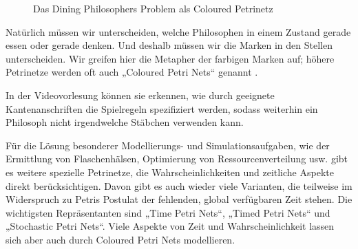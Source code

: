 \begin{figure}[!htbp]
	\centering
	\caption{Das Dining Philosophers Problem als Coloured Petrinetz}
	\label{fig:v9_fuenf_philosophen_colored}
\end{figure}


Natürlich müssen wir unterscheiden, welche Philosophen in einem Zustand gerade essen oder gerade denken. Und deshalb müssen wir die Marken in den Stellen unterscheiden. Wir greifen hier die Metapher der farbigen Marken auf; 
höhere Petrinetze werden oft auch „Coloured Petri Nets“ genannt \cite{jen09}.

In der Videovorlesung können sie erkennen, wie durch geeignete Kantenanschriften die Spielregeln spezifiziert werden, sodass weiterhin ein Philosoph nicht irgendwelche Stäbchen verwenden kann.

Für die Lösung besonderer Modellierungs- und Simulationsaufgaben, wie der Ermittlung von Flaschenhälsen, Optimierung von Ressourcenverteilung usw. gibt es weitere spezielle Petrinetze, die Wahrscheinlichkeiten und zeitliche Aspekte direkt berücksichtigen. Davon gibt es auch wieder viele Varianten, die teilweise im Widerspruch zu Petris Postulat der fehlenden, global verfügbaren Zeit stehen. Die wichtigsten Repräsentanten sind „Time Petri Nets“, „Timed Petri Nets“ und „Stochastic Petri Nets“. Viele Aspekte von Zeit und Wahrscheinlichkeit lassen sich aber auch durch Coloured Petri Nets modellieren.

